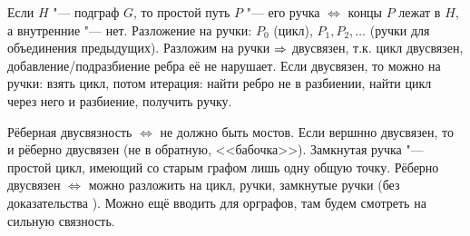 	Если $H$ "--- подграф $G$, то простой путь $P$ "--- его ручка $\iff$ концы $P$ лежат в $H$, а внутренние "--- нет.
	Разложение на ручки: $P_0$ (цикл), $P_1, P_2, \dots$ (ручки для объединения предыдущих).
	Разложим на ручки $\Rightarrow$ двусвязен, т.к. цикл двусвязен, добавление/подразбиение ребра её не нарушает.
	Если двусвязен, то можно на ручки: взять цикл, потом итерация: найти ребро не в разбиении, найти цикл через него и разбиение, получить ручку.

	Рёберная двусвязность $\iff$ не должно быть мостов.
	Если вершнно двусвязен, то и рёберно двусвязен (не в обратную, <<бабочка>>).
	Замкнутая ручка "--- простой цикл, имеющий со старым графом лишь одну общую точку.
	Рёберно двусвязен $\iff$ можно разложить на цикл, ручки, замкнутые ручки (без доказательства \TODO).
	Можно ещё вводить для орграфов, там будем смотреть на сильную связность.
